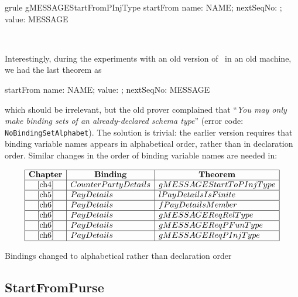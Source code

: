\begin{LGRT}
\begin{theorem}{grule gMESSAGEStartFromPInjType}
   startFrom \in \lblot name: NAME; nextSeqNo: \nat ;  value: \nat \rblot \pinj MESSAGE
\end{theorem}~\end{LGRT}
%
Interestingly, during the experiments with an old version of \zeves\ in an old machine,
we had the last theorem as
%
\begin{gzed}
  startFrom \in \lblot name: NAME; value: \nat; nextSeqNo: \nat \rblot \pinj MESSAGE
\end{gzed}
%
which should be irrelevant, but the old prover complained that ``\textit{You may only make binding sets of an already-declared schema type}''
(error code: \texttt{NoBindingSetAlphabet}). The solution is trivial: the earlier version requires that
binding variable names appears in alphabetical order, rather than in declaration order.
Similar changes in the order of binding variable names are needed in:
%
\begin{table}[ht]
\[
\begin{array}{|c|l|l|}
    \hline
    \multicolumn{1}{|c}{\mbox{\textbf{Chapter}}} & \multicolumn{1}{|c}{\mbox{\textbf{Binding}}} & \multicolumn{1}{|c|}{\mbox{\textbf{Theorem}}} \\
    \hline
    \ref{ch4}               & CounterPartyDetails     & gMESSAGEStartToPInjType \\
    \hline
    \ref{ch5}               & PayDetails              & lPayDetailsIsFinite \\
    \hline
    \ref{ch6}               & PayDetails              & fPayDetailsMember \\
    \hline
    \ref{ch6}               & PayDetails              & gMESSAGEReqRelType \\
    \hline
    \ref{ch6}               & PayDetails              & gMESSAGEReqPFunType \\
    \hline
    \ref{ch6}               & PayDetails              & gMESSAGEReqPInjType \\
    \hline
\end{array}
\]
\caption{Bindings changed to alphabetical rather than declaration order}
\end{table}

\subsection{StartFromPurse}\label{ch4.valTransferOp.StartFromPurse}


